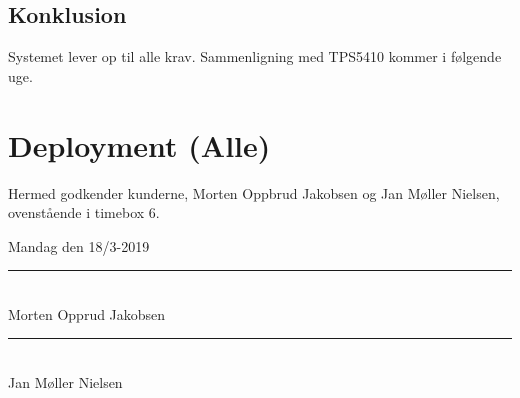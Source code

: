 \subsection{Konklusion}
\label{sec:konklusion-1}

Systemet lever op til alle krav. Sammenligning med TPS5410 kommer i følgende uge.

\section{Deployment (Alle)}
\label{sec:deployment}

Hermed godkender kunderne, Morten Oppbrud Jakobsen og Jan Møller Nielsen, ovenstående i timebox 6.

Mandag den 18/3-2019

\begin{minipage}{.5\textwidth}
  \begin{center}
    \vspace{1.4cm}
    \rule{0.8\textwidth}{0.1pt}\\
    \small{Morten Opprud Jakobsen\\%
    }
  \end{center}
\end{minipage}%
\begin{minipage}{0.5\textwidth}
  \begin{center}
    \vspace{1.4cm}
    \rule{0.8\textwidth}{0.1pt}\\
    \small{Jan Møller Nielsen\\%
    }
  \end{center}
\end{minipage}

